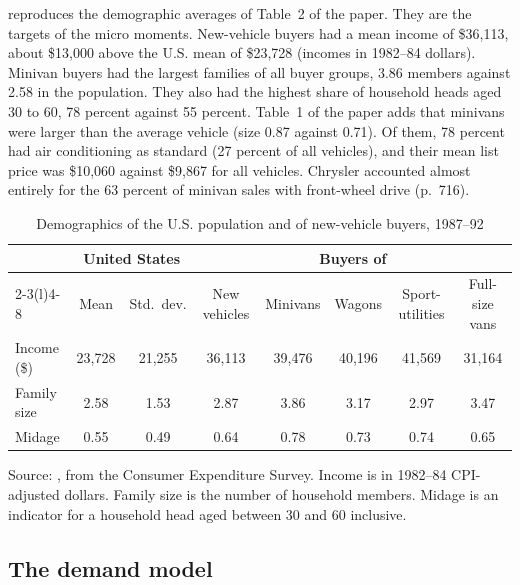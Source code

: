  reproduces the demographic averages of Table~2 of the paper. They are the targets of the micro
moments. New-vehicle buyers had a mean income of \$36,113, about \$13,000 above the U.S. mean of \$23,728 (incomes
in 1982--84 dollars). Minivan buyers had the largest families of all buyer groups, 3.86 members against 2.58 in the
population. They also had the highest share of household heads aged 30 to 60, 78 percent against 55 percent. Table~1 of
the paper adds that minivans were larger than the average vehicle (size 0.87 against 0.71). Of them, 78 percent had air
conditioning as standard (27 percent of all vehicles), and their mean list price was \$10,060 against \$9,867 for all
vehicles. Chrysler accounted almost entirely for the 63 percent of minivan sales with front-wheel drive (p.~716).

\begin{table}[htbp]
\centering
\caption{Demographics of the U.S. population and of new-vehicle buyers, 1987--92}\label{tab:10-petrin-cex}
\small
\setlength{\tabcolsep}{5pt}
\begin{tabular}{@{}lccccccc@{}}
\toprule
 & \multicolumn{2}{c}{United States} & \multicolumn{5}{c}{Buyers of} \\
\cmidrule(lr){2-3}\cmidrule(l){4-8}
 & Mean & Std.\ dev. & New vehicles & Minivans & Wagons & Sport-utilities & Full-size vans \\
\midrule
Income (\$)  & 23,728 & 21,255 & 36,113 & 39,476 & 40,196 & 41,569 & 31,164 \\
Family size  & 2.58   & 1.53   & 2.87   & 3.86   & 3.17   & 2.97   & 3.47   \\
Midage       & 0.55   & 0.49   & 0.64   & 0.78   & 0.73   & 0.74   & 0.65   \\
\bottomrule
\end{tabular}

\smallskip
\begin{minipage}{0.95\textwidth}
\footnotesize Source: \citet[Table~2]{Petrin2002}, from the Consumer Expenditure Survey. Income is in 1982--84
CPI-adjusted dollars. Family size is the number of household members. Midage is an indicator for a household head
aged between 30 and 60 inclusive.
\end{minipage}
\end{table}

\subsection{The demand model}\label{sec:10-petrin-model}

